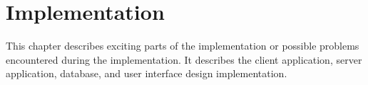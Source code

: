 \chapter{Implementation}
\label{chapter:implementation}

This chapter describes exciting parts of the implementation or possible problems encountered during the implementation.
It describes the client application, server application, database, and user interface design implementation.






